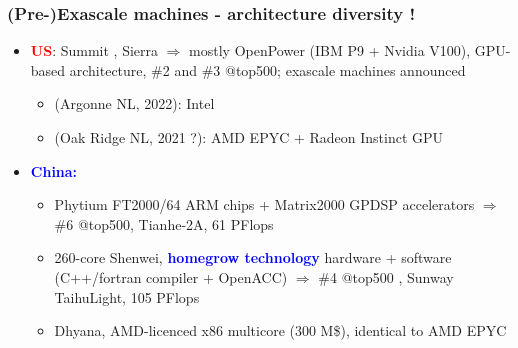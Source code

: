\begin{frame}
  \frametitle{(Pre-)Exascale machines - architecture diversity !}

  \begin{itemize}
  \item \textcolor{red}{\bf \large US}: Summit , Sierra $\Rightarrow$ mostly OpenPower (IBM P9 + Nvidia V100), GPU-based architecture, \#2 and \#3 @top500; exascale machines announced
    \begin{itemize}
     \item {} (Argonne NL, 2022): Intel 
     \item {} (Oak Ridge NL, 2021 ?): AMD EPYC + Radeon Instinct GPU
    \end{itemize}
  \item \textcolor{blue}{\bf \large China:}
    \begin{itemize}
    \item Phytium FT2000/64 ARM chips + Matrix2000 GPDSP accelerators $\Rightarrow$ \#6 @top500, Tianhe-2A, 61 PFlops
    \item 260-core Shenwei, \textcolor{blue}{\bf homegrow technology} hardware + software (C++/fortran compiler + OpenACC) $\Rightarrow$ \#4 @top500 , Sunway TaihuLight, 105 PFlops
    \item Dhyana, AMD-licenced x86 multicore (300 M\$), identical to AMD EPYC
    \end{itemize}


\end{itemize}
\end{frame}
